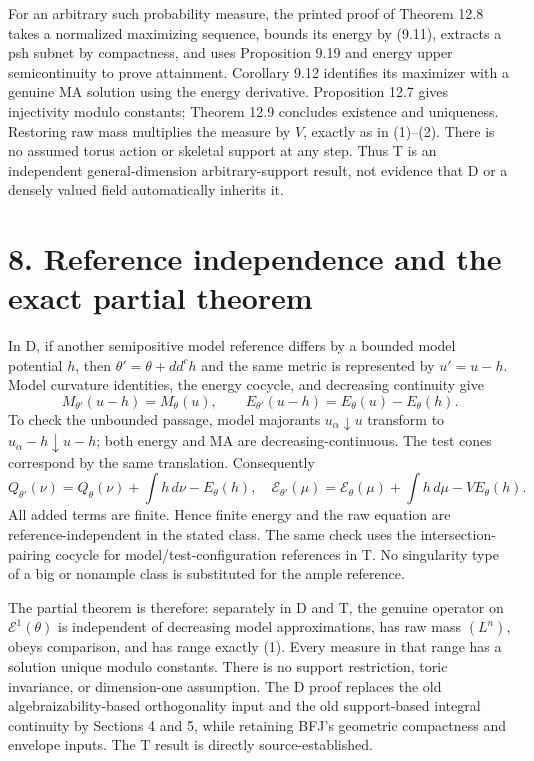 \documentclass[11pt]{article}
\begin{document}
For an arbitrary such probability measure, the printed proof of Theorem 12.8 takes a normalized maximizing sequence, bounds its energy by (9.11), extracts a psh subnet by compactness, and uses Proposition 9.19 and energy upper semicontinuity to prove attainment. Corollary 9.12 identifies its maximizer with a genuine MA solution using the energy derivative. Proposition 12.7 gives injectivity modulo constants; Theorem 12.9 concludes existence and uniqueness. Restoring raw mass multiplies the measure by \(V\), exactly as in (1)--(2). There is no assumed torus action or skeletal support at any step. Thus T is an independent general-dimension arbitrary-support result, not evidence that D or a densely valued field automatically inherits it.

\section*{8. Reference independence and the exact partial theorem}

In D, if another semipositive model reference differs by a bounded model potential \(h\), then \(\theta'=\theta+dd^ch\) and the same metric is represented by \(u'=u-h\). Model curvature identities, the energy cocycle, and decreasing continuity give
\[
 M_{\theta'}(u-h)=M_\theta(u),\qquad
 E_{\theta'}(u-h)=E_\theta(u)-E_\theta(h).
 \tag{18}
\]
To check the unbounded passage, model majorants \(u_\alpha\downarrow u\) transform to \(u_\alpha-h\downarrow u-h\); both energy and MA are decreasing-continuous. The test cones correspond by the same translation. Consequently
\[
 Q_{\theta'}(\nu)=Q_\theta(\nu)+\int h\,d\nu-E_\theta(h),
 \quad
 \mathscr E_{\theta'}(\mu)=\mathscr E_\theta(\mu)+\int h\,d\mu-VE_\theta(h).
 \tag{19}
\]
All added terms are finite. Hence finite energy and the raw equation are reference-independent in the stated class. The same check uses the intersection-pairing cocycle for model/test-configuration references in T. No singularity type of a big or nonample class is substituted for the ample reference.

The partial theorem is therefore: separately in D and T, the genuine operator on \(\mathcal E^1(\theta)\) is independent of decreasing model approximations, has raw mass \((L^n)\), obeys comparison, and has range exactly (1). Every measure in that range has a solution unique modulo constants. There is no support restriction, toric invariance, or dimension-one assumption. The D proof replaces the old algebraizability-based orthogonality input and the old support-based integral continuity by Sections 4 and 5, while retaining BFJ's geometric compactness and envelope inputs. The T result is directly source-established.
\end{document}
